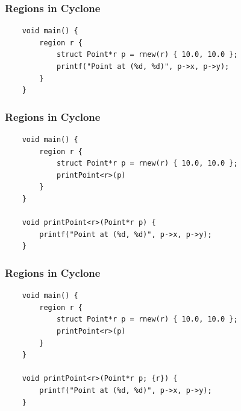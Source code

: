 \begin{frame}[fragile]
    \frametitle{Regions in Cyclone}
    \begin{verbatim}
    void main() {
        region r {
            struct Point*r p = rnew(r) { 10.0, 10.0 };
            printf("Point at (%d, %d)", p->x, p->y);
        }
    }
    \end{verbatim}
\end{frame}

\begin{frame}[fragile]
    \frametitle{Regions in Cyclone}
    \begin{verbatim}
    void main() {
        region r {
            struct Point*r p = rnew(r) { 10.0, 10.0 };
            printPoint<r>(p)
        }
    }

    void printPoint<r>(Point*r p) {
        printf("Point at (%d, %d)", p->x, p->y);
    }
    \end{verbatim}
\end{frame}

\begin{frame}[fragile]
    \frametitle{Regions in Cyclone}
    \begin{verbatim}
    void main() {
        region r {
            struct Point*r p = rnew(r) { 10.0, 10.0 };
            printPoint<r>(p)
        }
    }

    void printPoint<r>(Point*r p; {r}) {
        printf("Point at (%d, %d)", p->x, p->y);
    }
    \end{verbatim}
\end{frame}

